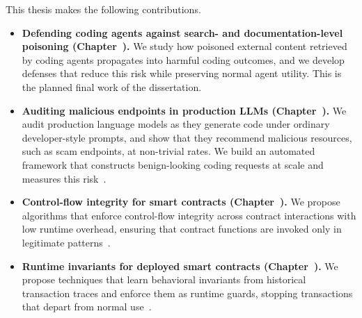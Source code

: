 This thesis makes the following contributions.
\begin{itemize}

    \item \textbf{Defending coding agents against search- and
    documentation-level poisoning (Chapter~).}
    We study how poisoned external content retrieved by coding agents propagates
    into harmful coding outcomes, and we develop defenses that reduce this risk
    while preserving normal agent utility. This is the planned final work of the
    dissertation.

    \item \textbf{Auditing malicious endpoints in production LLMs (Chapter~).}
    We audit production language models as they generate code under ordinary
    developer-style prompts, and show that they recommend malicious resources,
    such as scam endpoints, at non-trivial rates. We build an automated framework
    that constructs benign-looking coding requests at scale and measures this
    risk~\cite{chen2025scam2prompt}.

    \item \textbf{Control-flow integrity for smart contracts (Chapter~).}
    We propose algorithms that enforce control-flow integrity across contract
    interactions with low runtime overhead, ensuring that contract functions are
    invoked only in legitimate patterns~\cite{chen2025secure}.

    \item \textbf{Runtime invariants for deployed smart contracts (Chapter~).}
    We propose techniques that learn behavioral invariants from historical
    transaction traces and enforce them as runtime guards, stopping transactions
    that depart from normal use~\cite{chen2024demystifying}.
\end{itemize}
